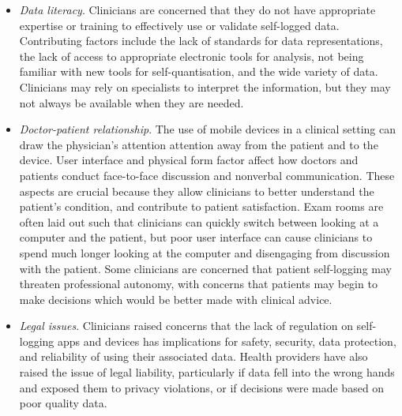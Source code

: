 \documentclass{sigchi}
\begin{document}
\begin{itemize}
    
    \item \textit{Data literacy}. Clinicians are concerned that they do not have appropriate expertise or training to effectively use or validate self-logged data. Contributing factors include the lack of standards for data representations, the lack of access to appropriate electronic tools for analysis, not being familiar with new tools for self-quantisation, and the wide variety of data. Clinicians may rely on specialists to interpret the information, but they may not always be available when they are needed.
    
    \item \textit{Doctor-patient relationship}. The use of mobile devices in a clinical setting can draw the physician's attention attention away from the patient and to the device. User interface and physical form factor affect how doctors and patients conduct face-to-face discussion and nonverbal communication. These aspects are crucial because they allow clinicians to better understand the patient's condition, and contribute to patient satisfaction. Exam rooms are often laid out such that clinicians can quickly switch between looking at a computer and the patient, but poor user interface can cause clinicians to spend much longer looking at the computer and disengaging from discussion with the patient. Some clinicians are concerned that patient self-logging may threaten professional autonomy, with concerns that patients may begin to make decisions which would be better made with clinical advice.

    
    
    \item \textit{Legal issues}. Clinicians raised concerns that the lack of regulation on self-logging apps and devices has implications for safety, security, data protection, and reliability of using their associated data. Health providers have also raised the issue of legal liability, particularly if data fell into the wrong hands and exposed them to privacy violations, or if decisions were made based on poor quality data.
\end{itemize}
\end{document}

